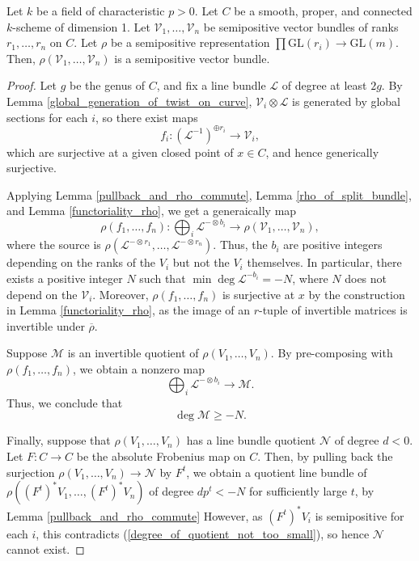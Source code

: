 \begin{lemma}\label{no_negative_quotient_on_curve_p}
Let $k$ be a field of characteristic $p>0$.
Let $C$ be a smooth, proper, and connected $k$-scheme of dimension 1. 
Let $\mathcal{V}_1,\ldots,\mathcal{V}_n$ be semipositive vector bundles of ranks $r_1,\ldots,r_n$ on $C$. 
Let $\rho$ be a semipositive representation $\prod \mathrm{GL}(r_i)\to \mathrm{GL}(m)$. 
Then, $\rho(\mathcal{V}_1,\ldots,\mathcal{V}_n)$ is a semipositive vector bundle.
\end{lemma}
\begin{proof}
Let $g$ be the genus of $C$, and fix a line bundle $\mathcal{L}$ of degree at least $2g$.
By Lemma \ref{global_generation_of_twist_on_curve}, $\mathcal{V}_i\otimes\mathcal{L}$ is generated by global sections for each $i$, so there exist maps
\begin{equation}
f_i:(\mathcal{L}^{-1})^{\oplus r_i}\to \mathcal{V}_i,
\end{equation}
which are surjective at a given closed point of $x\in C$, and hence generically surjective.

Applying Lemma \ref{pullback_and_rho_commute}, Lemma \ref{rho_of_split_bundle}, and Lemma \ref{functoriality_rho}, we get a generaically map
\begin{equation}
\rho(f_1,\ldots,f_n):\bigoplus_{i}\mathcal{L}^{-\otimes b_i}\to\rho(\mathcal{V}_1,\ldots,\mathcal{V}_n),
\end{equation}
where the source is $\rho(\mathcal{L}^{-\otimes r_1},\ldots,\mathcal{L}^{-\otimes r_n})$.
Thus, the $b_i$ are positive integers depending on the ranks of the $V_i$ but not the $V_i$ themselves.
In particular, there exists a positive integer $N$ such that $\min\deg\mathcal{L}^{-b_i}=-N$, where $N$ does not depend on the $\mathcal{V}_i$. Moreover, $\rho(f_1,\ldots,f_n)$ is surjective at $x$ by the construction in Lemma \ref{functoriality_rho}, as the image of an $r$-tuple of invertible matrices is invertible under $\overline{\rho}$.

Suppose $\mathcal{M}$ is an invertible quotient of $\rho(V_1,\ldots,V_n)$. By pre-composing with $\rho(f_1,\ldots,f_n)$, we obtain a nonzero map
$$
\bigoplus_{i}\mathcal{L}^{-\otimes b_i}\to\mathcal{M}.
$$
Thus, we conclude that
\begin{equation}\label{degree_of_quotient_not_too_small}
\deg\mathcal{M}\ge -N.
\end{equation}

Finally, suppose that $\rho(V_1,\ldots,V_n)$ has a line bundle quotient $\mathcal{N}$ of degree $d<0$. 
Let $F:C\to C$ be the absolute Frobenius map on $C$. 
Then, by pulling back the surjection $\rho(V_1,\ldots,V_n)\to\mathcal{N}$ by $F^t$, we obtain a quotient line bundle of $\rho((F^{t})^{*}V_1,\ldots,(F^{t})^{*}V_n)$ of degree $dp^{t}<-N$ for sufficiently large $t$, by Lemma \ref{pullback_and_rho_commute}
However, as $(F^{t})^*V_i$ is semipositive for each $i$, this contradicts (\ref{degree_of_quotient_not_too_small}), so hence $\mathcal{N}$ cannot exist.
\end{proof}

